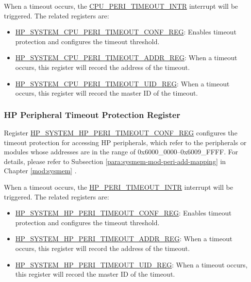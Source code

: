 \documentclass[main\_\_EN.tex]{subfiles}
\begin{document}
When a timeout occurs, the \hyperref[tab:peripheral-interrupt-config-status-source]{CPU\_PERI\_TIMEOUT\_INTR} interrupt will be triggered. The related registers are:

\begin{itemize}
    \item \hyperref[regdesc:HPSYSTEMCPUPERITIMEOUTCONFREG]{HP\_SYSTEM\_CPU\_PERI\_TIMEOUT\_CONF\_REG}: Enables timeout protection and configures the timeout threshold.
    \item \hyperref[regdesc:HPSYSTEMCPUPERITIMEOUTADDRREG]{HP\_SYSTEM\_CPU\_PERI\_TIMEOUT\_ADDR\_REG}: When a timeout occurs, this register will record the address of the timeout.
    \item \hyperref[regdesc:HPSYSTEMCPUPERITIMEOUTUIDREG]{HP\_SYSTEM\_CPU\_PERI\_TIMEOUT\_UID\_REG}: When a timeout occurs, this register will record the master ID of the timeout.
\end{itemize}


\subsubsection{HP Peripheral Timeout Protection Register}

Register \hyperref[regdesc:HPSYSTEMHPPERITIMEOUTCONFREG]{HP\_SYSTEM\_HP\_PERI\_TIMEOUT\_CONF\_REG} configures the timeout protection for accessing HP peripherals, which refer to the peripherals or modules whose addresses are in the range of 0x6000\_0000–0x6009\_FFFF. For details, please refer to Subsection \ref{para:sysmem-mod-peri-add-mapping} \textit{} in Chapter \ref{mod:sysmem} \textit{}.

When a timeout occurs, the \hyperref[tab:peripheral-interrupt-config-status-source]{HP\_PERI\_TIMEOUT\_INTR} interrupt will be triggered. The related registers are:

\begin{itemize}
    \item \hyperref[regdesc:HPSYSTEMHPPERITIMEOUTCONFREG]{HP\_SYSTEM\_HP\_PERI\_TIMEOUT\_CONF\_REG}: Enables timeout protection and configures the timeout threshold.
    \item \hyperref[regdesc:HPSYSTEMHPPERITIMEOUTADDRREG]{HP\_SYSTEM\_HP\_PERI\_TIMEOUT\_ADDR\_REG}: When a timeout occurs, this register will record the address of the timeout.
    \item \hyperref[regdesc:HPSYSTEMHPPERITIMEOUTUIDREG]{HP\_SYSTEM\_HP\_PERI\_TIMEOUT\_UID\_REG}: When a timeout occurs, this register will record the master ID of the timeout.
\end{itemize}
\end{document}
